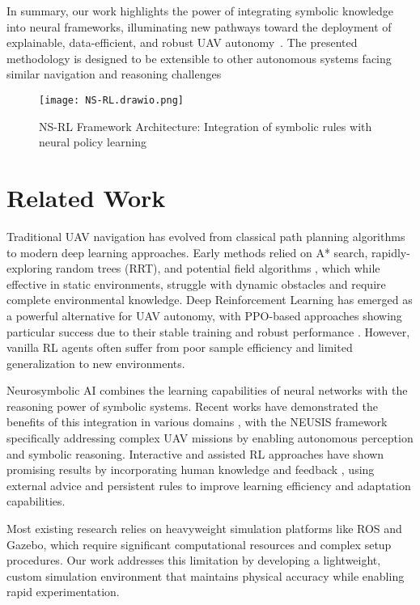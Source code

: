 \documentclass[pdflatex,sn-mathphys-num]{sn-jnl}
\theoremstyle{thmstyleone}%
\theoremstyle{thmstyletwo}%
\theoremstyle{thmstylethree}%
\begin{document}
In summary, our work highlights the power of integrating symbolic knowledge into neural frameworks, illuminating new pathways toward the deployment of explainable, data-efficient, and robust UAV autonomy~\cite{cai2025neusis,bignold2023conceptual,bignold2023persistent}. The presented methodology is designed to be extensible to other autonomous systems facing similar navigation and reasoning challenges

\begin{figure}
    \centering
    \texttt{[image: NS-RL.drawio.png]}
    \caption{NS-RL Framework Architecture: Integration of symbolic rules with neural policy learning}
    \label{fig:nsrl_architecture}
\end{figure}

\section{Related Work}

Traditional UAV navigation has evolved from classical path planning algorithms to modern deep learning approaches. Early methods relied on A* search, rapidly-exploring random trees (RRT), and potential field algorithms \cite{zhang2024algorithm}, which while effective in static environments, struggle with dynamic obstacles and require complete environmental knowledge. Deep Reinforcement Learning has emerged as a powerful alternative for UAV autonomy, with PPO-based approaches showing particular success due to their stable training and robust performance \cite{wang2022vision}. However, vanilla RL agents often suffer from poor sample efficiency and limited generalization to new environments.

Neurosymbolic AI combines the learning capabilities of neural networks with the reasoning power of symbolic systems. Recent works have demonstrated the benefits of this integration in various domains \cite{cai2025neusis}, with the NEUSIS framework specifically addressing complex UAV missions by enabling autonomous perception and symbolic reasoning. Interactive and assisted RL approaches have shown promising results by incorporating human knowledge and feedback \cite{bignold2023conceptual,bignold2023persistent}, using external advice and persistent rules to improve learning efficiency and adaptation capabilities.

Most existing research relies on heavyweight simulation platforms like ROS and Gazebo, which require significant computational resources and complex setup procedures. Our work addresses this limitation by developing a lightweight, custom simulation environment that maintains physical accuracy while enabling rapid experimentation.
\end{document}

